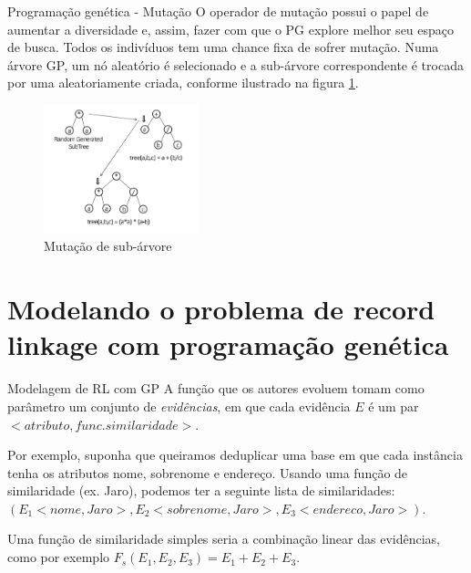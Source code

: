 \documentclass{beamer}
\begin{document}
  \begin{frame}{Programação genética - Mutação}
      O operador de mutação possui o papel de aumentar a diversidade e, assim, fazer com que o PG explore melhor seu espaço de busca. Todos os indivíduos tem uma chance fixa de sofrer mutação. Numa árvore GP, um nó aleatório é selecionado e a sub-árvore correspondente é trocada por uma aleatoriamente criada, conforme ilustrado na figura \ref{fig:mutacao}.
      \begin{figure}
          \centering
          \includegraphics[width=0.4\textwidth]{mutacao.png}
          \caption{Mutação de sub-árvore \cite{geneticrl}}
          \label{fig:mutacao}
      \end{figure}
  \end{frame}

  \section{Modelando o problema de record linkage com programação genética}

  \begin{frame}{Modelagem de RL com GP}
      A função que os autores evoluem tomam como parâmetro um conjunto de \textit{evidências}, em que cada evidência $E$ é um par $<atributo, func. similaridade>$. 

      Por exemplo, suponha que queiramos deduplicar uma base em que cada instância tenha os atributos nome, sobrenome e endereço. Usando uma função de similaridade (ex. Jaro), podemos ter a seguinte lista de similaridades: $(E_1<nome, Jaro>, E_2<sobrenome, Jaro>, E_3<endereco, Jaro>)$.

      Uma função de similaridade simples seria a combinação linear das evidências, como por exemplo $F_s(E_1, E_2, E_3) = E_1+E_2+E_3$.
  \end{frame}
\end{document}
